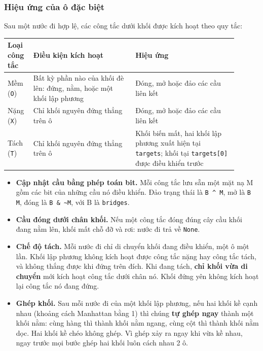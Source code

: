 \subsubsection{Hiệu ứng của ô đặc biệt}

Sau một nước đi hợp lệ, các công tắc dưới khối được kích hoạt theo quy tắc:

{\renewcommand{\arraystretch}{1.25}
\begin{longtable}{|>{\raggedright\arraybackslash}p{0.095\linewidth}|>{\raggedright\arraybackslash}p{0.400\linewidth}|>{\raggedright\arraybackslash}p{0.400\linewidth}|}
\hline
\textbf{Loại công tắc} & \textbf{Điều kiện kích hoạt} & \textbf{Hiệu ứng} \\ \hline
\endhead
\hline
\endlastfoot
Mềm (\texttt{O}) & Bất kỳ phần nào của khối đè lên: đứng, nằm, hoặc một khối lập phương & Đóng, mở hoặc đảo các cầu liên kết \\ \hline
Nặng (\texttt{X}) & Chỉ khối nguyên đứng thẳng trên ô & Đóng, mở hoặc đảo các cầu liên kết \\ \hline
Tách (\texttt{T}) & Chỉ khối nguyên đứng thẳng trên ô & Khối biến mất, hai khối lập phương xuất hiện tại \texttt{targets}; khối tại \texttt{targets[0]} được điều khiển trước \\
\end{longtable}
}

\begin{itemize}
\item \textbf{Cập nhật cầu bằng phép toán bit.} Mỗi công tắc lưu sẵn một mặt nạ M gồm các bit của những cầu nó điều khiển. Đảo trạng thái là \texttt{B \textasciicircum{} M}, mở là \texttt{B \textbar{} M}, đóng là \texttt{B \& \textasciitilde{}M}, với B là \texttt{bridges}.
\item \textbf{Cầu đóng dưới chân khối.} Nếu một công tắc đóng đúng cây cầu khối đang nằm lên, khối mất chỗ đỡ và rơi: nước đi trả về \texttt{None}.
\item \textbf{Chế độ tách.} Mỗi nước đi chỉ di chuyển khối đang điều khiển, một ô một lần. Khối lập phương không kích hoạt được công tắc nặng hay công tắc tách, và không thắng được khi đứng trên đích. Khi đang tách, \textbf{chỉ khối vừa di chuyển} mới kích hoạt công tắc dưới chân nó. Khối đứng yên không kích hoạt lại công tắc nó đang đứng.
\item \textbf{Ghép khối.} Sau mỗi nước đi của một khối lập phương, nếu hai khối kề cạnh nhau (khoảng cách Manhattan bằng 1) thì chúng \textbf{tự ghép ngay} thành một khối nằm: cùng hàng thì thành khối nằm ngang, cùng cột thì thành khối nằm dọc. Hai khối kề chéo không ghép. Vì ghép xảy ra ngay khi vừa kề nhau, ngay trước mọi bước ghép hai khối luôn cách nhau 2 ô.
\end{itemize}

